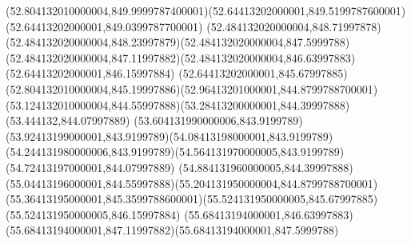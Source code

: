 {{	\curveto(52.804132010000004,849.9999787400001)(52.64413202000001,849.5199787600001)(52.64413202000001,849.0399787700001)
	\curveto(52.484132020000004,848.71997878)(52.484132020000004,848.23997879)(52.484132020000004,847.5999788)
	\curveto(52.484132020000004,847.11997882)(52.484132020000004,846.63997883)(52.64413202000001,846.15997884)
	\curveto(52.64413202000001,845.67997885)(52.804132010000004,845.19997886)(52.96413201000001,844.8799788700001)
	\curveto(53.124132010000004,844.55997888)(53.28413200000001,844.39997888)(53.444132,844.07997889)
	\curveto(53.604131990000006,843.9199789)(53.92413199000001,843.9199789)(54.08413198000001,843.9199789)
	\curveto(54.244131980000006,843.9199789)(54.564131970000005,843.9199789)(54.72413197000001,844.07997889)
	\curveto(54.884131960000005,844.39997888)(55.04413196000001,844.55997888)(55.204131950000004,844.8799788700001)
	\curveto(55.36413195000001,845.3599788600001)(55.524131950000005,845.67997885)(55.524131950000005,846.15997884)
	\curveto(55.68413194000001,846.63997883)(55.68413194000001,847.11997882)(55.68413194000001,847.5999788)
	\closepath
}
}
{
}
{
}
{
}
